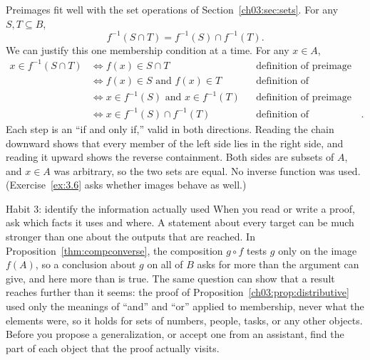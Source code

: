Preimages fit well with the set operations of Section~\ref{ch03:sec:sets}. For any $S,T\subseteq B$,
\[
f^{-1}(S\cap T)=f^{-1}(S)\cap f^{-1}(T).
\]
We can justify this one membership condition at a time. For any $x\in A$,
\begin{align*}
 x\in f^{-1}(S\cap T)
 &\Longleftrightarrow f(x)\in S\cap T &&\text{definition of preimage}\\
 &\Longleftrightarrow f(x)\in S\text{ and }f(x)\in T
 &&\text{definition of intersection}\\
 &\Longleftrightarrow x\in f^{-1}(S)\text{ and }x\in f^{-1}(T)
 &&\text{definition of preimage}\\
 &\Longleftrightarrow x\in f^{-1}(S)\cap f^{-1}(T)
 &&\text{definition of intersection}.
\end{align*}
Each step is an ``if and only if,'' valid in both directions. Reading the chain downward shows that every member of the left side lies in the right side, and reading it upward shows the reverse containment. Both sides are subsets of $A$, and $x\in A$ was arbitrary, so the two sets are equal. No inverse function was used. (Exercise~\ref{ex:3.6} asks whether images behave as well.)

\begin{principle}{Habit 3: identify the information actually used}
When you read or write a proof, ask which facts it uses and where. A statement about every target can be much stronger than one about the outputs that are reached. In Proposition~\ref{thm:compconverse}, the composition $g\circ f$ tests $g$ only on the image $f(A)$, so a conclusion about $g$ on all of $B$ asks for more than the argument can give, and here more than is true. The same question can show that a result reaches further than it seems: the proof of Proposition~\ref{ch03:prop:distributive} used only the meanings of ``and'' and ``or'' applied to membership, never what the elements were, so it holds for sets of numbers, people, tasks, or any other objects. Before you propose a generalization, or accept one from an assistant, find the part of each object that the proof actually visits.
\end{principle}
